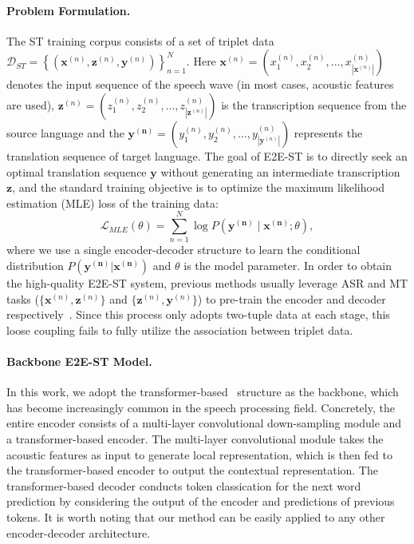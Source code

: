 \documentclass[letterpaper]{article} %
\begin{document}
\paragraph{Problem Formulation.}
The ST training corpus consists of a set of triplet
data $\mathcal{D}_{ST}=\left\{(\mathbf{x}^{(n)}, \mathbf{z}^{(n)}, \mathbf{y}^{(n)})\right\}_{n=1}^{N}$.
Here $\mathbf{x}^{(n)}=(x_1^{(n)}, x_2^{(n)},...,x_{|\mathbf{x}^{(n)}|}^{(n)})$ denotes the input sequence of the speech wave (in most cases, acoustic features are used), $\mathbf{z}^{(n)}=(z_1^{(n)},z_2^{(n)},...,z_{|\mathbf{z}^{(n)}|}^{(n)})$ is the transcription sequence from the source language and the $\mathbf{y^{(n)}}=(y_1^{(n)}, y_2^{(n)},...,y_{|\mathbf{y}^{(n)}|}^{(n)})$ represents the translation sequence of target language.
The goal of E2E-ST is to directly seek an optimal translation sequence $\mathbf{y}$ without generating an intermediate transcription $\mathbf{z}$, and the standard training objective is to optimize the maximum likelihood estimation (MLE) loss of the training data:
\begin{equation}
    \mathcal{L}_{MLE}(\theta)=\sum_{n=1}^{N} \log P\left(\mathbf{y^{(n)}}  \mid \mathbf{x^{(n)}} ; \theta\right),
    \label{eq:vanilla_st}
\end{equation}
where we use a single encoder-decoder structure to learn the conditional distribution $P(\mathbf{y^{(n)}}|\mathbf{x^{(n)}})$ and $\theta$ is the model parameter.
In order to obtain the high-quality E2E-ST system, previous methods usually leverage ASR and MT tasks ($\{\mathbf{x}^{(n)}, \mathbf{z}^{(n)}\}$ and $\{\mathbf{z}^{(n)}, \mathbf{y}^{(n)}\}$) to pre-train the encoder and decoder respectively~\cite{Bansal2019PretrainingOH, Wang2020BridgingTG, Wang2020CurriculumPF}.
Since this process only adopts two-tuple data at each stage, this loose coupling fails to fully utilize the association between triplet data.

\paragraph{Backbone E2E-ST Model.}
In this work, we adopt the transformer-based~\cite{Vaswani2017AttentionIA} structure as the backbone, which has become increasingly common in the speech processing field.
Concretely, the entire encoder consists of a multi-layer convolutional down-sampling module and a transformer-based encoder.
The multi-layer convolutional module takes the acoustic features as input to generate local representation, which is then fed to the transformer-based encoder to output the contextual representation.
The transformer-based decoder conducts token classication for the next word prediction by considering the output of the encoder and predictions of previous tokens.
It is worth noting that our method can be easily applied to any other encoder-decoder architecture.
\end{document}
